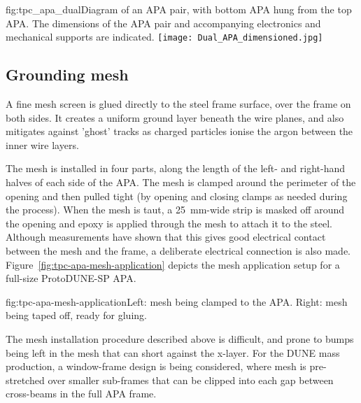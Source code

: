 \begin{dunefigure}{fig:tpc_apa_dual}{Diagram of an APA pair, with bottom APA hung from the top APA. The dimensions of the APA pair and accompanying electronics and mechanical supports are indicated.}
\texttt{[image: Dual\_APA\_dimensioned.jpg]} 
\end{dunefigure}


\subsection{Grounding mesh}
\label{sec:fdsp-apa-mesh}

A fine mesh screen is glued directly to the steel frame surface, over the frame on both sides.  It creates a uniform ground layer beneath the wire planes, and also mitigates against 'ghost' tracks as charged particles ionise the argon between the inner wire layers.

The mesh is installed in four parts, along the length of the left- and right-hand halves of each side of the APA. The mesh is clamped around the perimeter of the opening and then pulled tight (by opening and closing clamps as needed during the process).  When the mesh is taut, a \SI{25}{mm}-wide strip is masked off around the opening and epoxy is applied through the mesh to attach it to the steel.  Although measurements have shown that this gives good electrical contact between the mesh and the frame, a deliberate electrical connection is also made.  Figure~\ref{fig:tpc-apa-mesh-application} depicts the mesh application setup for a full-size ProtoDUNE-SP APA.

\begin{dunefigure}{fig:tpc-apa-mesh-application}{Left: mesh being clamped to the APA. Right: mesh being taped off, ready for gluing.}
\setlength{\fboxsep}{0pt}
\setlength{\fboxrule}{0.5pt}
\end{dunefigure}

The mesh installation procedure described above is difficult, and prone to bumps being left in the mesh that can short against the x-layer. For the DUNE mass production, a window-frame design is being considered, where mesh is pre-stretched over smaller sub-frames that can be clipped into each gap between cross-beams in the full APA frame.


